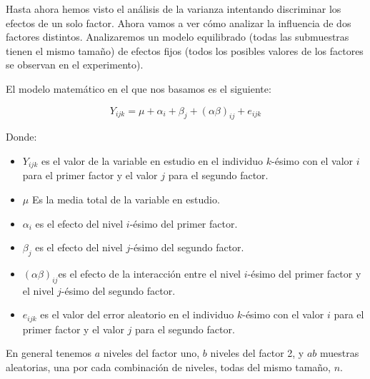 
Hasta ahora hemos visto el an\'alisis de la varianza intentando discriminar los efectos de un solo factor. Ahora vamos a ver c\'omo analizar la influencia de dos factores distintos. Analizaremos un modelo equilibrado (todas las submuestras tienen el mismo tama\~no) de efectos fijos (todos los posibles valores de los factores se observan en el experimento).

El modelo matem\'atico en el que nos basamos es el siguiente:

\[Y_{ijk}=\mu+\alpha_i+\beta_j+(\alpha\beta)_{ij}+e_{ijk}\]

Donde:
\begin{itemize}
\item $Y_{ijk}$ es el valor de la variable en estudio en el individuo $k$-\'esimo con el valor $i$ para el primer factor y el valor $j$ para el segundo factor.
\item $\mu$ Es la media total de la variable en estudio.
\item $\alpha_i$ es el efecto del nivel $i$-\'esimo del primer factor.
\item $\beta_j$ es el efecto del nivel $j$-\'esimo del segundo factor.
\item $(\alpha\beta)_{ij}$es el efecto de la interacci\'on entre el nivel $i$-\'esimo del primer factor y el nivel $j$-\'esimo del segundo factor.
\item $e_{ijk}$ es el valor del error aleatorio en el individuo $k$-\'esimo con el valor $i$ para el primer factor y el valor $j$ para el segundo factor.
\end{itemize} 

En general tenemos $a$ niveles del factor uno, $b$ niveles del factor 2, y $ab$ muestras aleatorias, una por cada combinaci\'on de niveles, todas del mismo tama\~no, $n$.
